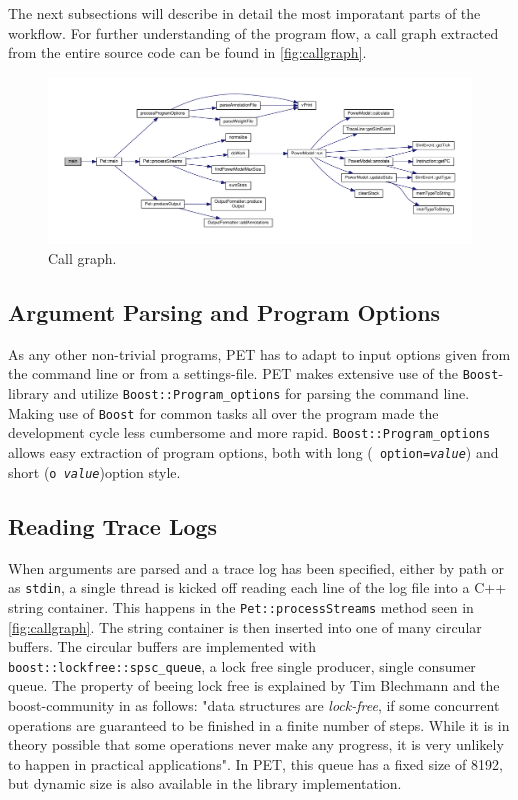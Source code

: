 The next subsections will describe in detail the most imporatant parts of the
workflow. For further understanding of the program flow, a call graph extracted
from the entire source code can be found in \autoref{fig:callgraph}.

\begin{figure}
    \includegraphics[width=\textwidth]{figs/maincallgraph.pdf}
    \caption{Call graph.}
    \label{fig:callgraph}
\end{figure}



\subsection{Argument Parsing and Program Options}

As any other non-trivial programs, PET has to adapt to input options given from
the command line or from a settings-file. PET makes extensive use of the
\texttt{Boost}-library \cite{boostwebpage} and utilize
\texttt{Boost::Program\_options} for parsing the command line. Making use of
\texttt{Boost} for common tasks all over the program made the development cycle
less cumbersome and more rapid. \texttt{Boost::Program\_options} allows easy
extraction of program options, both with long (\texttt{\textemdash \textemdash
option=\emph{value}}) and short (\texttt{\textemdash o~\emph{value}})option
style.


\subsection{Reading Trace Logs}

When arguments are parsed and a trace log has been specified, either by path or
as \texttt{stdin}, a single thread is kicked off reading each line of the log
file into a C++ string container. This happens in the
\texttt{Pet::processStreams} method seen in \autoref{fig:callgraph}. The string
container is then inserted into one of many circular buffers. The circular
buffers are implemented with \texttt{boost::lockfree::spsc\_queue}, a lock free
single producer, single consumer queue. The property of beeing lock free is
explained by Tim Blechmann and the boost-community in \cite{boostlockfree} as
follows: "data structures are \emph{lock-free}, if some concurrent operations
are guaranteed to be finished in a finite number of steps. While it is in theory
possible that some operations never make any progress, it is very unlikely to
happen in practical applications". In PET, this queue has a fixed size of 8192,
but dynamic size is also available in the library implementation.

